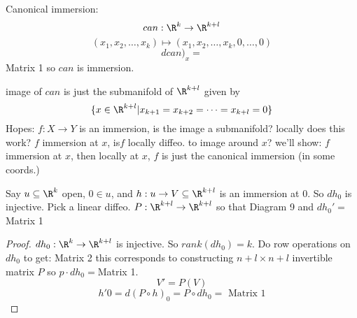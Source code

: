 \begin{definition}
  Canonical immersion:
    $$can: \R^k \to \R^{k+l}$$
    $$(x_1,x_2,\dots,x_k) \mapsto (x_1,x_2,\dots,x_k,0,\dots,0)$$
    $$dcan)_x=
    $$
    Matrix 1
    \newline so $can$ is immersion.
\end{definition}
image of $can $ is just the submanifold of $\R^{k+l}$ given by
  $$\{x\in \R^{k+l} | x_{k+1}=x_{k+2}=\cdots=x_{k+l}=0\}$$
Hopes: $f: X \to Y$ is an immersion, is the image a submanifold?
\newline locally does this work?
$f$ immersion at $x$, is$f$ locally diffeo. to image around $x$?
\newline we'll show: $f$ immersion at $x$, then locally at $x$, $f$ is just the canonical immersion (in some coords.)
\begin{lemma}
  Say $u \subseteq \R^k$ open, $0\in u$, and $h: u\to V \subseteq \R^{k+l}$ is an immersion at $0$.
  \newline So $dh_0$ is injective.
  \newline Pick a linear diffeo. $P:\R^{k+l}\to \R^{k+l}$ so that
  \newline Diagram 9
  \newline and $dh_0'=$ Matrix 1
\end{lemma}
\begin{proof}
  $dh_0:\R^k\to \R^{k+l}$ is injective. So $rank(dh_0)=k$. Do row operations on $dh_0$ to get:
  \newline Matrix 2
  \newline this corresponds to constructing $n+l \times n+l$ invertible matrix $P$ so $p \cdot dh_0= $Matrix 1.
    $$V'=P(V)$$
    $$h'0=d(P\circ h)_0=P\circ dh_0= \text{ Matrix 1}$$
\end{proof}

